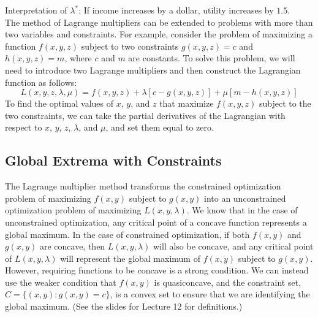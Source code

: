 \documentclass{./../../latex/handout}
\begin{document}
Interpretation of $\lambda^*$: If income increases by a dollar, utility increases by $1.5$.\\

The method of Lagrange multipliers can be extended to problems with more than two variables and constraints. For example, consider the problem of maximizing a function $f(x,y,z)$ subject to two constraints $g(x,y,z) = c$ and $h(x,y,z) = m$, where $c$ and $m$ are constants. To solve this problem, we will need to introduce two Lagrange multipliers and then construct the Lagrangian function as follows:
\[L(x,y,z,\lambda,\mu) = f(x,y,z) + \lambda [c-g(x,y,z)] + \mu [m-h(x,y,z)]\]
To find the optimal values of $x$, $y$, and $z$ that maximize $f(x,y,z)$ subject to the two constraints, we can take the partial derivatives of the Lagrangian with respect to $x$, $y$, $z$, $\lambda$, and $\mu$, and set them equal to zero. 

\subsection*{Global Extrema with Constraints}

The Lagrange multiplier method transforms the constrained optimization problem of maximizing $f(x,y)$ subject to $g(x,y)$ into an unconstrained optimization problem of maximizing $ L(x, y, \lambda)$. We know that in the case of unconstrained optimization, any critical point of a concave function represents a global maximum. In the case of constrained optimization, if both $f(x,y)$ and $g(x,y)$ are concave, then $L(x,y,\lambda)$ will also be concave, and any critical point of $L(x,y,\lambda)$ will represent the global maximum of $f(x,y)$ subject to $g(x,y)$. However, requiring functions to be concave is a strong condition. We can instead use the weaker condition that $f(x,y)$ is quasiconcave, and the constraint set, $C=\{(x,y):g(x,y)=c\}$, is a convex set to ensure that we are identifying the global maximum. (See the slides for Lecture 12 for definitions.) \\

 \\
\end{document}
